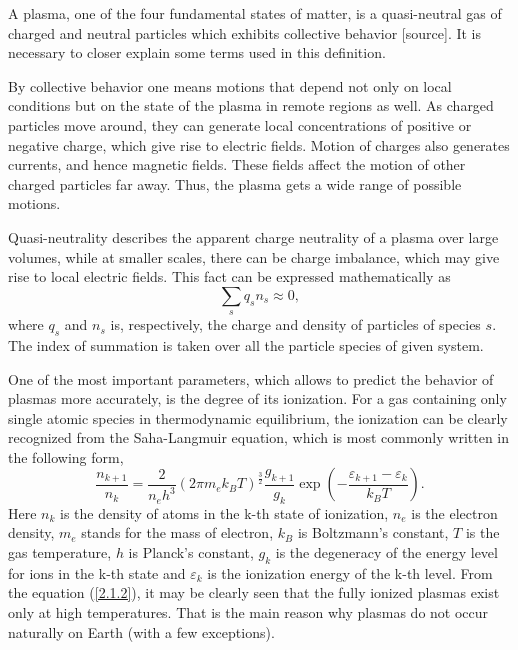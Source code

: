 A plasma, one of the four fundamental states of matter, is a quasi-neutral gas of charged and neutral particles which exhibits collective behavior [source]. It is necessary to closer explain some terms used in this definition.

By collective behavior one means motions that depend not only on local conditions but on the state of the plasma in remote regions as well. As charged particles move around, they can generate local concentrations of positive or negative charge, which give rise to electric fields. Motion of charges also generates currents, and hence magnetic fields. These fields affect the motion of other charged particles far away. Thus, the plasma gets a wide range of possible motions.

Quasi-neutrality describes the apparent charge neutrality of a plasma over large volumes, while at smaller scales, there can be charge imbalance, which may give rise to local electric fields. This fact can be expressed mathematically as
\begin{equation}
\label{2.1.1}
\sum_{s} q_s n_s \approx 0,
\end{equation}
where $ q_s $ and $ n_s $ is, respectively, the charge and density of particles of species $ s $. The index of summation is taken over all the particle species of given system.

One of the most important parameters, which allows to predict the behavior of plasmas more accurately, is the degree of its ionization. For a gas containing only single atomic species in thermodynamic equilibrium, the ionization can be clearly recognized from the Saha-Langmuir equation, which is most commonly written in the following form,
\begin{equation}
\label{2.1.2}
\frac{n_{k+1}}{n_k} = \frac{2}{n_e h^3}\left(2\pi m_e k_B T\right)^{\frac{3}{2}} \frac{g_{k+1}}{g_k} \exp\left(-\frac{\varepsilon_{k+1} - \varepsilon_{k}}{k_{B} T} \right).
\end{equation}
Here $ n_k $ is the density of atoms in the k-th state of ionization, $ n_e $ is the electron density, $ m_e $ stands for the mass of electron, $ k_B $ is Boltzmann's constant, $ T $ is the gas temperature, $ h $ is Planck's constant, $ g_k $ is the degeneracy of the energy level for ions in the k-th state and $ \varepsilon_k $ is the ionization energy of the k-th level. From the equation (\ref{2.1.2}), it may be clearly seen that the fully ionized plasmas exist only at high temperatures. That is the main reason why plasmas do not occur naturally on Earth (with a few exceptions).

